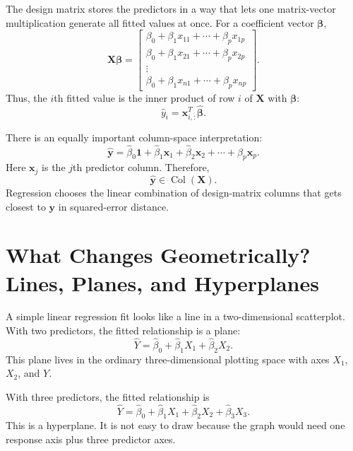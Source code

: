 The design matrix stores the predictors in a way that lets one matrix-vector multiplication generate all fitted values at once.  For a coefficient vector \(\boldsymbol{\beta}\),
\begin{equation}
  \mathbf{X}\boldsymbol{\beta}
  =\begin{bmatrix}
    \beta_0+\beta_1x_{11}+\cdots+\beta_px_{1p}\\
    \beta_0+\beta_1x_{21}+\cdots+\beta_px_{2p}\\
    \vdots\\
    \beta_0+\beta_1x_{n1}+\cdots+\beta_px_{np}
  \end{bmatrix}.
\end{equation}
Thus, the \(i\)th fitted value is the inner product of row \(i\) of \(\mathbf{X}\) with \(\boldsymbol{\beta}\):
\begin{equation}
  \widehat{y}_i=\mathbf{x}_{i,:}^T\widehat{\boldsymbol{\beta}}.
\end{equation}

There is an equally important column-space interpretation:
\begin{equation}
  \widehat{\mathbf{y}}
  =\widehat{\beta}_0\mathbf{1}
  +\widehat{\beta}_1\mathbf{x}_1
  +\widehat{\beta}_2\mathbf{x}_2
  +\cdots
  +\widehat{\beta}_p\mathbf{x}_p.
\end{equation}
Here \(\mathbf{x}_j\) is the \(j\)th predictor column.  Therefore,
\begin{equation}
  \widehat{\mathbf{y}}\in\operatorname{Col}(\mathbf{X}).
\end{equation}
Regression chooses the linear combination of design-matrix columns that gets closest to \(\mathbf{y}\) in squared-error distance.

\section{What Changes Geometrically? Lines, Planes, and Hyperplanes}

A simple linear regression fit looks like a line in a two-dimensional scatterplot.  With two predictors, the fitted relationship is a plane:
\begin{equation}
  \widehat{Y}=\widehat{\beta}_0+\widehat{\beta}_1X_1+\widehat{\beta}_2X_2.
\end{equation}
This plane lives in the ordinary three-dimensional plotting space with axes \(X_1\), \(X_2\), and \(Y\).

With three predictors, the fitted relationship is
\begin{equation}
  \widehat{Y}=\widehat{\beta}_0+\widehat{\beta}_1X_1+\widehat{\beta}_2X_2+\widehat{\beta}_3X_3.
\end{equation}
This is a hyperplane.  It is not easy to draw because the graph would need one response axis plus three predictor axes.

